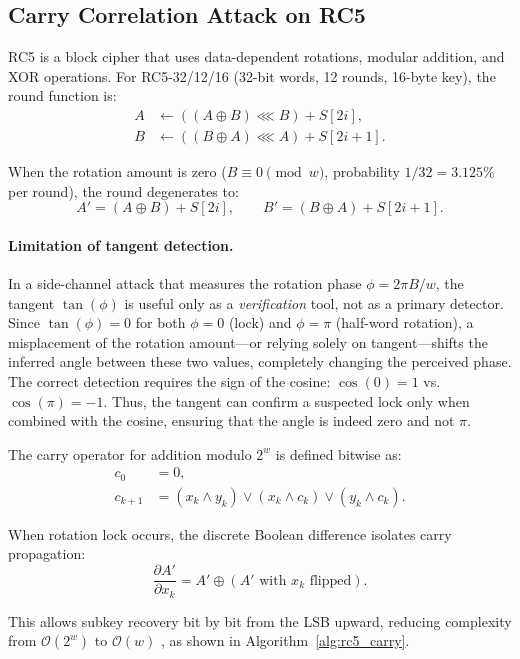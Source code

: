 \documentclass{sbc2023-pdf}%
\theoremstyle{plain}
\begin{document}
\subsection{Carry Correlation Attack on RC5}

RC5 is a block cipher that uses data-dependent rotations, modular addition, and XOR operations. For RC5-32/12/16 (32-bit words, 12 rounds, 16-byte key), the round function is:
\begin{align}
A &\leftarrow ((A \oplus B) \lll B) + S[2i],\\
B &\leftarrow ((B \oplus A) \lll A) + S[2i+1].
\end{align}

When the rotation amount is zero (\(B \equiv 0 \pmod w\), probability \(1/32 = 3.125\%\) per round), the round degenerates to:
\[
A' = (A \oplus B) + S[2i], \qquad B' = (B \oplus A) + S[2i+1].
\]

\paragraph{Limitation of tangent detection.}
In a side-channel attack that measures the rotation phase \(\phi = 2\pi B/w\), the tangent \(\tan(\phi)\) is useful only as a \emph{verification} tool, not as a primary detector. Since \(\tan(\phi)=0\) for both \(\phi=0\) (lock) and \(\phi=\pi\) (half-word rotation), a misplacement of the rotation amount---or relying solely on tangent---shifts the inferred angle between these two values, completely changing the perceived phase. The correct detection requires the sign of the cosine: \(\cos(0)=1\) vs.\ \(\cos(\pi)=-1\). Thus, the tangent can confirm a suspected lock only when combined with the cosine, ensuring that the angle is indeed zero and not \(\pi\).

The carry operator for addition modulo \(2^w\) is defined bitwise as:
\begin{align*}
c_0 &= 0,\\
c_{k+1} &= (x_k \wedge y_k) \vee (x_k \wedge c_k) \vee (y_k \wedge c_k).
\end{align*}

When rotation lock occurs, the discrete Boolean difference isolates carry propagation:
\[
\frac{\partial A'}{\partial x_k} = A' \oplus (A' \text{ with } x_k \text{ flipped}).
\]

This allows subkey recovery bit by bit from the LSB upward, reducing complexity from \(\mathcal{O}(2^w)\) to \(\mathcal{O}(w)\) \citep{knuth1997}, as shown in Algorithm~\ref{alg:rc5_carry}.
\end{document}
